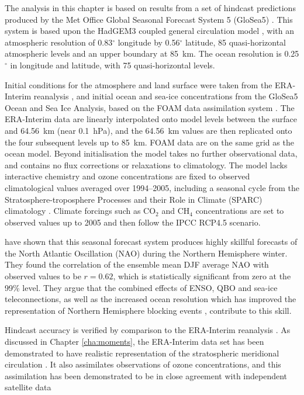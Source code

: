 The analysis in this chapter is based on results from a set of hindcast
predictions produced by the Met Office Global Seasonal Forecast System 5
(GloSea5) \citep{MacLachlan2014}. This system is based upon the HadGEM3 coupled
general circulation model \citep{Hewitt2011}, with an atmospheric resolution of
0.83$^{\circ}$ longitude by 0.56$^{\circ}$ latitude, 85 quasi-horizontal
atmospheric levels and an upper boundary at 85~km. The ocean resolution is
0.25$^{\circ}$ in longitude and latitude, with 75 quasi-horizontal levels.

Initial conditions for the atmosphere and land surface were taken from the
ERA-Interim reanalysis \citep{Dee2011}, and initial ocean and sea-ice
concentrations from the GloSea5 Ocean and Sea Ice Analysis, based on the FOAM
data assimilation system \citep{Blockley2013}. The ERA-Interim data are linearly
interpolated onto model levels between the surface and 64.56~km (near 0.1~hPa),
and the 64.56~km values are then replicated onto the four subsequent levels up
to 85~km. FOAM data are on the same grid as the ocean model. Beyond
initialisation the model takes no further observational data, and contains no
flux corrections or relaxations to climatology. The model lacks interactive
chemistry and ozone concentrations are fixed to observed climatological values
averaged over 1994--2005, including a seasonal cycle from the
Stratosphere-troposphere Processes and their Role in Climate (SPARC) climatology
\citep{Cionni2011}. Climate forcings such as CO$_2$ and CH$_4$ concentrations
are set to observed values up to 2005 and then follow the IPCC RCP4.5 scenario. 

\citet{Scaife2013} have shown that this seasonal forecast system produces highly
skillful forecasts of the North Atlantic Oscillation (NAO) during the Northern
Hemisphere winter. They found the correlation of the ensemble mean DJF average
NAO with observed values to be $r=0.62$, which is statistically significant from
zero at the 99\% level. They argue that the combined effects of ENSO, QBO and
sea-ice teleconnections, as well as the increased ocean resolution which has
improved the representation of Northern Hemisphere blocking events
\citep{Scaife2011a}, contribute to this skill.

Hindcast accuracy is verified by comparison to the ERA-Interim reanalysis
\citep{Dee2011}. As discussed in Chapter \ref{cha:moments}, the ERA-Interim data
set has been demonstrated to have realistic representation of the stratospheric
meridional circulation \citep{Seviour2012, Monge-Sanz2013}. It also assimilates
observations of ozone concentrations, and this assimilation has been
demonstrated to be in close agreement with independent satellite data
\citep{Dragani2011}

